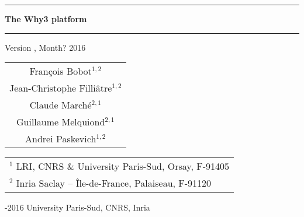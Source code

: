 \documentclass[a4paper,11pt,twoside,openright]{memoir}
\begin{document}
\sloppy

\thispagestyle{empty}

\begin{center}

\rule\textwidth{0.8mm}

\vfill

{
\fontsize{40}{40pt}\selectfont
\bfseries\sffamily The Why3 platform}

\vfill

\rule\textwidth{0.8mm}

\vfill


\begin{LARGE}
  Version \whyversion{}, Month? 2016
\end{LARGE}

\vfill

\begin{Large}
  \begin{tabular}{c}
  Fran\c{c}ois Bobot$^{1,2}$ \\
  Jean-Christophe Filli\^atre$^{1,2}$  \\
  Claude March\'e$^{2,1}$ \\
  Guillaume Melquiond$^{2,1}$\\
  Andrei Paskevich$^{1,2}$
\end{tabular}
\end{Large}
\vfill

\begin{flushleft}

\begin{tabular}{l}
$^1$ LRI, CNRS \& University Paris-Sud, Orsay, F-91405 \\
$^2$ Inria Saclay -- \^Ile-de-France, Palaiseau, F-91120
\end{tabular}

\bigskip

  -2016 University Paris-Sud, CNRS, Inria



\end{flushleft}
\end{center}
\end{document}
